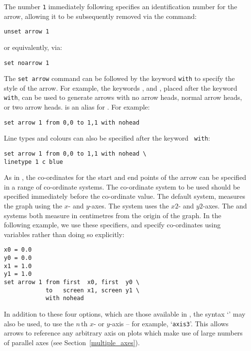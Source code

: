 \noindent The number {\tt 1} immediately following 
specifies an identification number for the arrow, allowing it to be
subsequently removed via the command:

\begin{verbatim}
unset arrow 1
\end{verbatim}

\noindent or equivalently, via:

\begin{verbatim}
set noarrow 1
\end{verbatim}

The {\tt set arrow} command can be followed by the keyword {\tt with} to
specify the style of the arrow. For example, the keywords ,
 and , placed after the keyword {\tt with}, can
be used to generate arrows with no arrow heads, normal arrow heads, or two
arrow heads.   is an alias for .  For example:

\begin{verbatim}
set arrow 1 from 0,0 to 1,1 with nohead
\end{verbatim}

\noindent Line types and colours can also be specified after the keyword {\tt
with}:

\begin{verbatim}
set arrow 1 from 0,0 to 1,1 with nohead \
linetype 1 c blue
\end{verbatim}

As in \gnuplot, the co-ordinates for the start and end points of the arrow can
be specified in a range of co-ordinate systems. The co-ordinate system to be
used should be specified immediately before the co-ordinate value. The default
system, \indcot{first} measures the graph using the $x$- and $y$-axes. The
\indcot{second} system uses the $x2$- and $y2$-axes. The \indcot{screen} and
\indcot{graph} systems both measure in centimetres from the origin of the
graph. In the following example, we use these specifiers, and specify
co-ordinates using variables rather than doing so explicitly:

\begin{verbatim}
x0 = 0.0
y0 = 0.0
x1 = 1.0
y1 = 1.0
set arrow 1 from first  x0, first  y0 \
            to   screen x1, screen y1 \
            with nohead
\end{verbatim}

In addition to these four options, which are those available in \gnuplot, the
syntax `' may also be used, to use the $n\,$th $x$- or
$y$-axis -- for example, `{\tt axis3}'. This allows arrows to
reference any arbitrary axis on plots which make use of large numbers of
parallel axes (see Section~\ref{multiple_axes}).

